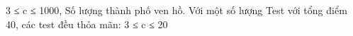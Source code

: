 3 ≤ c ≤ 1000, Số lượng thành phố ven hồ.
Với một số lượng Test với tổng điểm 40, các test đều thỏa mãn: 3 ≤ c ≤ 20
